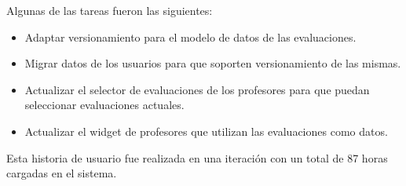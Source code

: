 Algunas de las tareas fueron las siguientes:
\begin{itemize}
	\item Adaptar versionamiento para el modelo de datos de las evaluaciones.
	\item Migrar datos de los usuarios para que soporten versionamiento de las mismas.
	\item Actualizar el selector de evaluaciones de los profesores para que puedan seleccionar evaluaciones actuales.
	\item Actualizar el widget de profesores que utilizan las evaluaciones como datos.
\end{itemize}

Esta historia de usuario fue realizada en una iteración con un total de 87 horas cargadas en el sistema.
